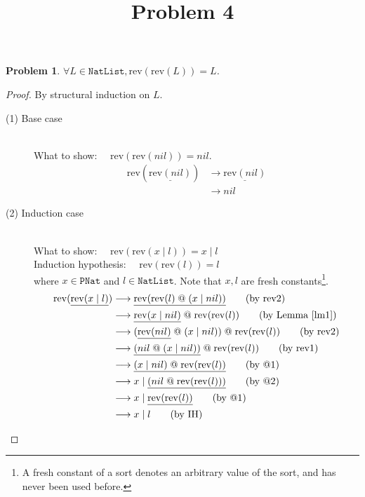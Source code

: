 \documentclass[12pt, a4paper]{article}
\title{Problem 4}
\date{\vspace{-5ex}}
\newtheorem{problem}{Problem}
\newcommand{\rel}[1]{\mathrel{#1}}
\newcommand{\rmx}[1]{\mathrm{#1}}
\newcommand{\larrow}{\longrightarrow}
\newcommand{\under}{\underline}
\begin{document}
\maketitle

\begin{problem}
$\forall L \in \mathtt{NatList}, \rmx{rev}(\rmx{rev}(L)) = L$.
\end{problem}
\begin{proof}
By structural induction on $L$.

\begin{description}
\item[(1) Base case]~\\
\noindent
What to show: $\quad\rmx{rev}(\rmx{rev}(nil)) = nil$.
\begin{align*}
\rmx{rev}(\under{\rmx{rev}(nil)})
	&\larrow \under{\rmx{rev}(nil)} \tag{by rev1} \\
	&\larrow nil \tag{by rev1}
\end{align*}

\item[(2) Induction case]~\\
What to show: $\quad \rmx{rev}(\rmx{rev}(x \rel{|} l)) = x \rel{|} l$ \\
Induction hypothesis: $\quad \rmx{rev}(\rmx{rev}(l)) = l$  \\
where $x \in \mathtt{PNat}$ and $l \in \mathtt{NatList}$. Note that $x, l$ are fresh constants\footnote{A fresh constant of a sort denotes an arbitrary value of the sort, and has never been used before.}.
\begin{align*}
\rmx{rev}(\under{\rmx{rev}(x \rel{|} l)})
	&\larrow \under{\rmx{rev}(\rmx{rev}(l) \rel{@} (x \rel{|} nil))} \tag{by rev2} \\
	&\larrow \under{\rmx{rev}(x \rel{|} nil)} \rel{@} \rmx{rev}(\rmx{rev}(l)) \tag{by Lemma~\ref{lm1}} \\
	&\larrow (\under{\rmx{rev}(nil)} \rel{@} (x \rel{|} nil)) \rel{@} \rmx{rev}(\rmx{rev}(l)) \tag{by rev2} \\
	&\larrow \under{(nil \rel{@} (x \rel{|} nil))} \rel{@} \rmx{rev}(\rmx{rev}(l)) \tag{by rev1} \\
	&\larrow \under{(x \rel{|} nil) \rel{@} \rmx{rev}(\rmx{rev}(l))} \tag{by @1} \\
	&\larrow x \rel{|} \under{(nil \rel{@} \rmx{rev}(\rmx{rev}(l)))} \tag{by @2} \\
	&\larrow x \rel{|} \under{\rmx{rev}(\rmx{rev}(l))} \tag{by @1} \\
	&\larrow x \rel{|} l \tag{by IH}
\end{align*}

\end{description}

\end{proof}
\end{document}
